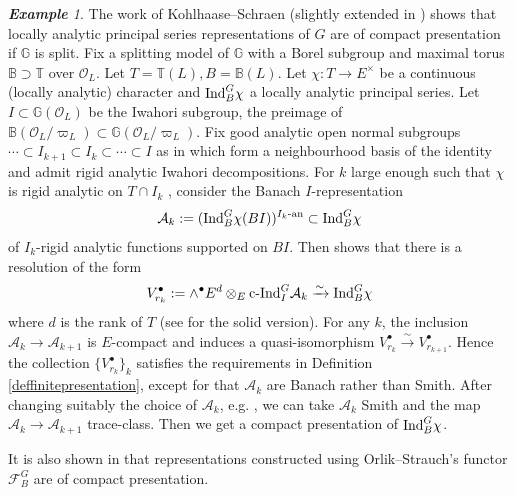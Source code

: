 \documentclass[a4paper,10pt]{amsart}
\theoremstyle{remark}
\newtheorem{example}[theorem]{\bf Example}
\theoremstyle{definition}
\theoremstyle{plain}
\numberwithin{equation}{section}
\newcommand{\bbB}{{\mathbb B}}
\newcommand{\bbG}{{\mathbb G}}
\newcommand{\bbT}{{\mathbb T}}
\newcommand{\calA}{{\mathcal A}}
\newcommand{\calF}{{\mathcal F}}
\newcommand{\calO}{{\mathcal O}}
\newcommand{\Ind}{{\rm Ind}}
\newcommand{\cInd}{\mathrm{c\text{-}Ind}}
\begin{document}
\begin{example}
	The work of Kohlhaase--Schraen \cite{kohlhaase2012homological} (slightly extended in \cite{strauch2025bernsteinzelevinskydualitylocallyanalytic}) shows that locally analytic principal series representations of $G$ are of compact presentation if $\bbG$ is split. Fix a splitting model of $\bbG$ with a Borel subgroup and maximal torus $\bbB\supset \bbT$ over $\calO_L$. Let $T=\bbT(L), B=\bbB(L)$. Let $\chi:T\to E^{\times}$ be a continuous (locally analytic) character and $\Ind_B^G\chi$ a locally analytic principal series. Let $I\subset \bbG(\calO_L)$ be the Iwahori subgroup, the preimage of $ \bbB(\calO_L/\varpi_L)\subset \bbG(\calO_L/\varpi_L)$. Fix good analytic open normal subgroups $\cdots\subset I_{k+1}\subset I_k\subset\cdots\subset I$ as in \cite[Def.~4.1.3, Prop.~4.1.6]{emerton2006jacquet} which form a neighbourhood basis of the identity and admit rigid analytic Iwahori decompositions. For $k$ large enough such that $\chi$ is rigid analytic on $T\cap I_k$ \cite[\S~3.4]{emerton2017locally}, consider the Banach $I$-representation
	\[
		\calA_k:=(\Ind_B^G\chi(BI))^{I_k\text{-an}}\subset\Ind_B^G\chi
	\]
	of $I_k$-rigid analytic functions supported on $BI$. Then \cite[Thm.~2.5]{kohlhaase2012homological} shows that there is a resolution of the form
	\begin{align}\label{equationPSKoszul}
		V_{r_k}^\bullet:=\wedge^{\bullet}E^{d}\otimes_{E}\cInd_I^G \calA_k\xrightarrow{\sim}\Ind_B^G\chi
	\end{align} where $d$ is the rank of $T$ (see \cite[Prop.~5.2]{strauch2025bernsteinzelevinskydualitylocallyanalytic} for the solid version). For any $k$, the inclusion $\calA_k\rightarrow \calA_{k+1}$ is $E$-compact and induces a quasi-isomorphism $V_{r_k}^\bullet\xrightarrow{\sim} V_{r_{k+1}}^\bullet$. Hence the collection $\{V_{r_k}^\bullet\}_{k}$ satisfies the requirements in Definition \ref{deffinitepresentation}, except for that $\calA_k$ are Banach rather than Smith. After changing suitably the choice of $\calA_k$, e.g. \cite[Lem.~2.17]{strauch2025bernsteinzelevinskydualitylocallyanalytic}, we can take $ \calA_k$ Smith and the map $\calA_k\rightarrow \calA_{k+1}$ trace-class. Then we get a compact presentation of $\Ind_B^G\chi$. 
	
	It is also shown in \cite{strauch2025bernsteinzelevinskydualitylocallyanalytic} that representations constructed using Orlik--Strauch's functor $\calF_{B}^G$ are of compact presentation.
\end{example}
\end{document}

